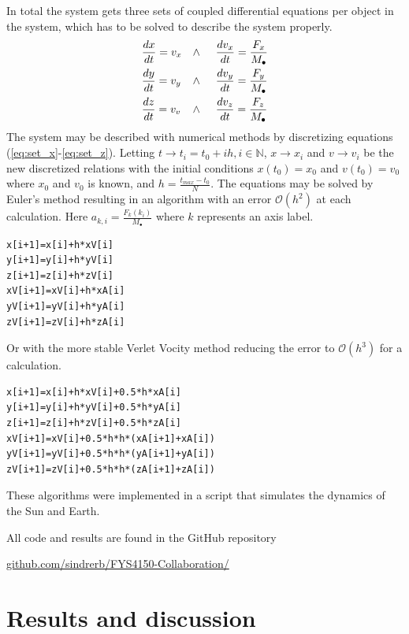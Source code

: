 \documentclass[twoside,twocolumn]{article}
\newcommand{\nl}{
	
	\medskip
	\noindent
}
\newcommand{\planet}{\bullet}
\newcommand{\err}[1]{\mathcal{O}(#1)}
\begin{document}
In total the system gets three sets of coupled differential equations per object in the system, which has to be solved to describe the system properly.
\begin{align}
&\frac{dx}{dt}=v_x &\wedge \hspace{0.5cm} &\frac{dv_x}{dt}=\frac{F_x}{M_\planet}\label{eq:set_x}\\
&\frac{dy}{dt}=v_y &\wedge \hspace{0.5cm} &\frac{dv_y}{dt}=\frac{F_y}{M_\planet}\label{eq:set_y}\\
&\frac{dz}{dt}=v_v &\wedge \hspace{0.5cm} &\frac{dv_z}{dt}=\frac{F_z}{M_\planet}\label{eq:set_z}
\end{align}
The system may be described with numerical methods by discretizing equations (\ref{eq:set_x}-\ref{eq:set_z}). Letting  $t\rightarrow t_i=t_0+ih, i\in \mathbb{N}$, $x\rightarrow x_i$ and $v\rightarrow v_i$ be the new discretized relations with the initial conditions $x(t_0)=x_0$ and $v(t_0)=v_0$ where $x_0$ and $v_0$ is known, and $h=\frac{t_{max}-t_0}{N} $. The equations may be solved by Euler's method resulting in an algorithm with an error $\err{h^2}$ at each calculation. Here $a_{k,i}=\frac{F_k(k_i)}{M_\planet}$ where $k$ represents an axis label.
\begin{lstlisting}[style=customc]
x[i+1]=x[i]+h*xV[i]
y[i+1]=y[i]+h*yV[i]
z[i+1]=z[i]+h*zV[i]
xV[i+1]=xV[i]+h*xA[i]
yV[i+1]=yV[i]+h*yA[i]
zV[i+1]=zV[i]+h*zA[i]
\end{lstlisting}

Or with the more stable Verlet Vocity method reducing the error to $\err{h^3}$ for a calculation. 
\begin{lstlisting}[style=customc]
x[i+1]=x[i]+h*xV[i]+0.5*h*xA[i]
y[i+1]=y[i]+h*yV[i]+0.5*h*yA[i]
z[i+1]=z[i]+h*zV[i]+0.5*h*zA[i]
xV[i+1]=xV[i]+0.5*h*h*(xA[i+1]+xA[i])
yV[i+1]=yV[i]+0.5*h*h*(yA[i+1]+yA[i])
zV[i+1]=zV[i]+0.5*h*h*(zA[i+1]+zA[i])
\end{lstlisting}
These algorithms were implemented in a script that simulates the dynamics of the Sun and Earth. 

All code and results are found in the GitHub repository\nl
{\small \href{https://github.com/sindrerb/FYS4150-Collaboration/tree/master/Doc/Project3}{github.com/sindrerb/FYS4150-Collaboration/}}
\section{Results and discussion}
\label{sec:results}
\end{document}
